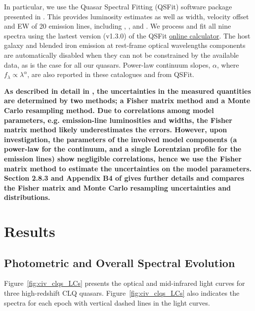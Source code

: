 \documentclass[fleqn,usenatbib]{mnras}
\begin{document}
In particular, we use the Quasar Spectral Fitting (QSFit) software
package presented in \citet{Calderone2017}. This provides luminosity
estimates as well as width, velocity offset and EW of 20 emission
lines, including \civ, \ciii, and \mgii.  We process and fit all nine
spectra using the lastest version (v1.3.0) of the QSFit
\href{https://qsfit.inaf.it/cat_1.30/onlinefit.php}{online
calculator}. The host galaxy and blended iron emission at rest-frame
optical wavelengths components are automatically disabled when they
can not be constrained by the available data, as is the case for all
our quasars.  Power-law continuum slopes, $\alpha$, where $f_{\lambda}
\propto \lambda^{\alpha}$, are also reported in these catalogues and
from QSFit.

{\bf As described in detail in \citet{Calderone2017}, the
uncertainties in the measured quantities are determined by two
methods; a Fisher matrix method and a Monte Carlo resampling method.
Due to correlations among model parameters, e.g. emission-line
luminosities and widths, the Fisher matrix method likely
underestimates the errors.  However, upon investigation, the
parameters of the involved model components (a power-law for the
continuum, and a single Lorentzian profile for the emission lines)
show negligible correlations, hence we use the Fisher matrix method
to estimate the uncertainties on the model parameters.  Section 2.8.3
and Appendix B4 of \citet{Calderone2017} gives further details and
compares the Fisher matrix and Monte Carlo resampling uncertainties
and distributions.}
  




\section{Results}
\subsection{Photometric and Overall Spectral Evolution}
Figure~\ref{fig:civ_clqs_LCs} presents the optical and mid-infrared light
curves for three high-redshift CLQ quasars.  Figure~\ref{fig:civ_clqs_LCs}
also indicates the spectra for each epoch with vertical dashed lines
in the light curves.
\end{document}
